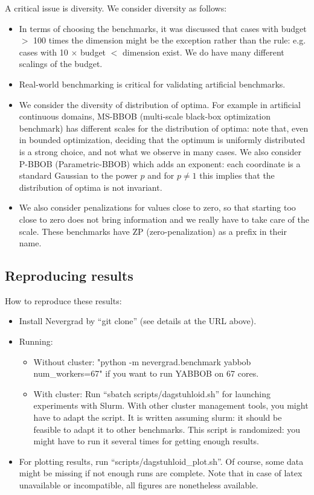 \documentclass{article}
\begin{document}
A critical issue is diversity. We consider diversity as follows:
\begin{itemize}
\item In terms of choosing the benchmarks, it was discussed that cases with budget $>$ 100 times the dimension might be
the exception rather than the rule: e.g. cases with 10 $\times$ budget $<$ dimension exist. We do have many different
scalings of the budget.
\item Real-world benchmarking is critical for validating artificial benchmarks. 
\item We consider the diversity of distribution of optima. For example in artificial continuous domains, MS-BBOB
(multi-scale black-box optimization benchmark) has
different scales for the distribution of optima: note that, even in bounded optimization, deciding that the optimum is
uniformly distributed is a strong choice, and not what we observe in many cases. We also consider P-BBOB
(Parametric-BBOB) which adds an exponent: each coordinate is a standard Gaussian to the power $p$ and for $p\neq 1$ this
implies that the distribution of optima is not invariant.
\item We also consider penalizations for values close to zero, so that starting too close to zero does not bring
information and we really have to take care of the scale. These benchmarks have ZP (zero-penalization) as a prefix in
their name.
\end{itemize}

\subsection{Reproducing results}
How to reproduce these results:
\begin{itemize}
\item Install Nevergrad by “git clone” (see details at the URL above).
\item  Running:
\begin{itemize}
\item Without cluster: "python -m nevergrad.benchmark yabbob \-\-num\_workers=67" if you want to run YABBOB on 67 cores. 
\item With cluster: Run “sbatch scripts/dagstuhloid.sh” for launching experiments with Slurm. With other cluster management tools, you might have to adapt the script. It is written assuming slurm: it should be feasible to adapt it to other benchmarks. This script is randomized: you might have to run it several times for getting enough results.
\end{itemize}
\item For plotting results, run “scripts/dagstuhloid\_plot.sh”. Of course, some data might be missing if not enough runs are complete. Note that in case of latex unavailable or incompatible, all figures are nonetheless available.
\end{itemize}
\end{document}
